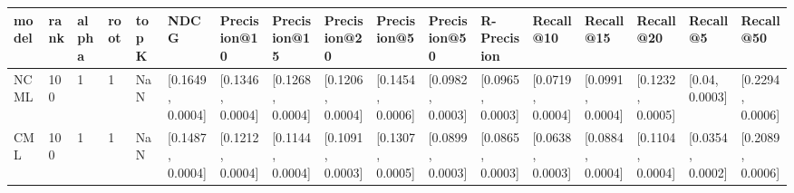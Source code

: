 \begin{tabular}{lllllllllllllllll}
\toprule
model & rank & alpha & root & topK &              NDCG &      Precision@10 &      Precision@15 &      Precision@20 &       Precision@5 &      Precision@50 &       R-Precision &         Recall@10 &         Recall@15 &         Recall@20 &          Recall@5 &         Recall@50 \\
\midrule
 NCML &  100 &     1 &    1 &  NaN &  [0.1649, 0.0004] &  [0.1346, 0.0004] &  [0.1268, 0.0004] &  [0.1206, 0.0004] &  [0.1454, 0.0006] &  [0.0982, 0.0003] &  [0.0965, 0.0003] &  [0.0719, 0.0004] &  [0.0991, 0.0004] &  [0.1232, 0.0005] &    [0.04, 0.0003] &  [0.2294, 0.0006] \\
  CML &  100 &     1 &    1 &  NaN &  [0.1487, 0.0004] &  [0.1212, 0.0004] &  [0.1144, 0.0004] &  [0.1091, 0.0003] &  [0.1307, 0.0005] &  [0.0899, 0.0003] &  [0.0865, 0.0003] &  [0.0638, 0.0003] &  [0.0884, 0.0004] &  [0.1104, 0.0004] &  [0.0354, 0.0002] &  [0.2089, 0.0006] \\
\bottomrule
\end{tabular}

